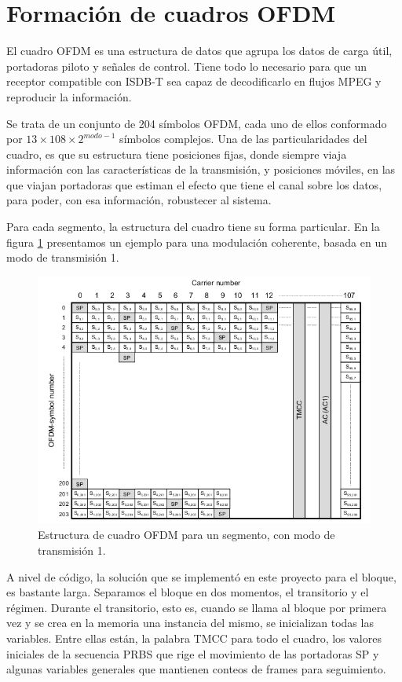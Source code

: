\section{Formación de cuadros OFDM}
El cuadro OFDM es una estructura de datos que agrupa los datos de carga \'util, portadoras piloto y señales de control. Tiene todo lo necesario para que un receptor compatible con ISDB-T sea capaz de decodificarlo en flujos MPEG y reproducir la informaci\'on.

Se trata de un conjunto de 204 s\'imbolos OFDM, cada uno de ellos conformado por $13 \times 108 \times 2^{modo -1}$ s\'imbolos complejos. Una de las particularidades del cuadro, es que su estructura tiene posiciones fijas, donde siempre viaja información con las características de la transmisión, y posiciones móviles, en las que viajan portadoras que estiman el efecto que tiene el canal sobre los datos, para poder, con esa información, robustecer al sistema. 

Para cada segmento, la estructura del cuadro tiene su forma particular. En la figura \ref{f:ofdm_frame} presentamos un ejemplo para una modulación coherente, basada en un modo de transmisión 1.

\begin{figure}[!h]
	\centering
	\includegraphics[scale=0.5]{figuras/cap05/ofdm_frame}
	\caption{\label{f:ofdm_frame} Estructura de cuadro OFDM para un segmento, con modo de transmisión 1.}
\end{figure}

A nivel de código, la solución que se implementó en este proyecto para el bloque, es bastante larga. Separamos el bloque en dos momentos, el transitorio y el régimen. Durante el transitorio, esto es, cuando se llama al bloque por primera vez y se crea en la memoria una instancia del mismo, se inicializan todas las variables. Entre ellas están, la palabra TMCC para todo el cuadro, los valores iniciales de la secuencia PRBS que rige el movimiento de las portadoras SP y algunas variables generales que mantienen conteos de frames para seguimiento.

